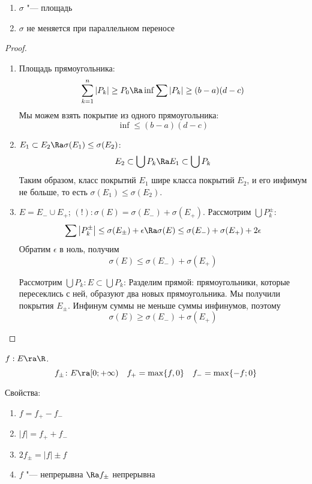 \begin{theorem}
	\begin{enumerate}
		\item $\sigma$ "--- площадь
		\item $\sigma$ не меняется при параллельном переносе
	\end{enumerate}
\end{theorem}
\begin{proof}
	\begin{enumerate}
	\item
		Площадь прямоугольника:
		\[ \sum_{k = 1}^n |P_k| \ge P_0 \Ra \inf{\sum|P_k|} \ge (b - a)(d - c) \]
		Мы можем взять покрытие из одного прямоугольника:
		\[ \inf \le (b - a)(d - c) \]

	\item
		$E_1 \subset E_2 \Ra \sigma(E_1) \le \sigma(E_2)$:
		\[ E_2 \subset \bigcup P_k \Ra E_1 \subset \bigcup P_k  \]
		Таким образом, класс покрытий $E_1$ шире класса покрытий $E_2$, и его инфимум не больше, то есть $\sigma(E_1) \le \sigma(E_2)$.

	\item
		$E = E_{-} \cup E_{+}$; $(!)\colon \sigma(E) = \sigma(E_{-}) + \sigma(E_{+})$.
		Рассмотрим $\bigcup P_k^{\pm}$:
		\[ \sum \left|P_k^{\pm}\right| \le \sigma(E_{\pm}) + \epsilon \Ra \sigma(E) \le \sigma(E_{-}) + \sigma(E_{+}) + 2\epsilon \]
		Обратим $\epsilon$ в ноль, получим
		\[ \sigma(E) \le \sigma(E_{-}) + \sigma(E_{+}) \]

		Рассмотрим $\bigcup P_k\colon E \subset \bigcup P_k$:
		Разделим прямой: прямоугольники, которые пересеклись с ней, образуют два новых прямоугольника. Мы получили покрытия $E_{\pm}$.
		Инфинум суммы не меньше суммы инфинумов, поэтому
		\[ \sigma(E) \ge \sigma(E_{-}) + \sigma(E_{+}) \]
	\end{enumerate}
\end{proof}

\begin{Def}
	$f: E \ra \R$.
	\[ f_\pm\colon E \ra [0; +\infty) \quad f_+ = \max\{f, 0\} \quad f_- = \max \{-f; 0\} \]
\end{Def}
Свойства:
\begin{enumerate}
	\item $f = f_+ - f_- $
	\item $|f| = f_+ + f_- $
	\item $2f_\pm = |f| \pm f$
	\item $f$ "--- непрерывна $ \Ra f_\pm $ непрерывна
\end{enumerate}

